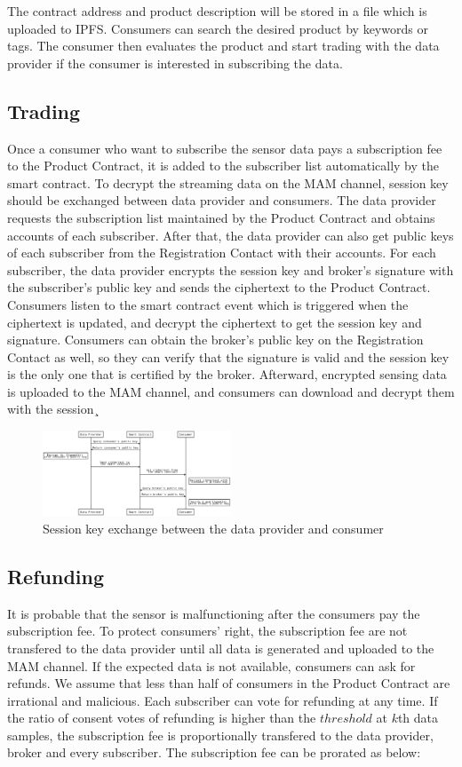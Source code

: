 \documentclass[journal,a4paper]{IEEEtran}
\begin{document}
The contract address and product description will be stored in a file which is uploaded to IPFS. Consumers can search the desired product by keywords or tags. The consumer then evaluates the product and start trading with the data provider if the consumer is interested in subscribing the data.

\subsection{Trading}
Once a consumer who want to subscribe the sensor data pays a subscription fee to the Product Contract, it is added to the subscriber list automatically by the smart contract. To decrypt the streaming data on the MAM channel, session key should be exchanged between data provider and consumers. The data provider requests the subscription list maintained by the Product Contract and obtains accounts of each subscriber. After that, the data provider can also get public keys of each subscriber from the Registration Contact with their accounts. For each subscriber, the data provider encrypts the session key and broker's signature with the subscriber's public key and sends the ciphertext to the Product Contract. Consumers listen to the smart contract event which is triggered when the ciphertext is updated, and decrypt the ciphertext to get the session key and signature. Consumers can obtain the broker's public key on the Registration Contact as well, so they can verify that the signature is valid and the session key is the only one that is certified by the broker. Afterward, encrypted sensing data is uploaded to the MAM channel, and consumers can download and decrypt them with the session¸

\begin{figure}[h]
	\centering
	\includegraphics[width=0.5\textwidth]{key_exchange}
	\caption{Session key exchange between the data provider and consumer}
	\label{fig:key_exchange}
\end{figure}

\subsection{Refunding}
It is probable that the sensor is malfunctioning after the consumers pay the subscription fee. To protect consumers' right, the subscription fee are not transfered to the data provider until all data is generated and uploaded to the MAM channel. If the expected data is not available, consumers can ask for refunds. We assume that less than half of consumers in the Product Contract are irrational and malicious. Each subscriber can vote for refunding at any time. If the ratio of consent votes of refunding is higher than the $threshold$ at $k$th data samples, the subscription fee is proportionally transfered to the data provider, broker and every subscriber. The subscription fee can be prorated as below:
\end{document}
